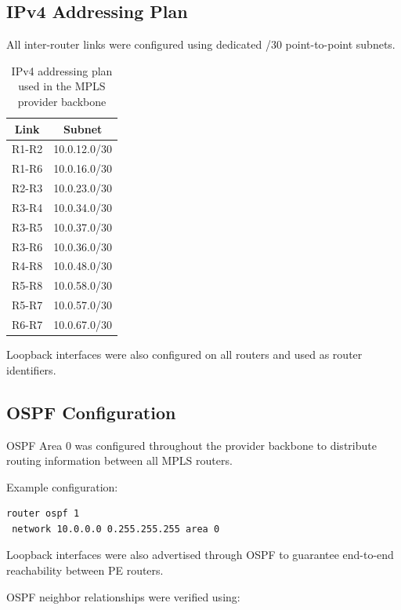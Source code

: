 \documentclass[12pt]{article}
\begin{document}
\subsection{IPv4 Addressing Plan}

All inter-router links were configured using dedicated /30 point-to-point subnets.

\begin{table}[H]
\centering
\begin{tabular}{cc}
\toprule
\textbf{Link} & \textbf{Subnet} \\
\midrule
R1-R2 & 10.0.12.0/30 \\
R1-R6 & 10.0.16.0/30 \\
R2-R3 & 10.0.23.0/30 \\
R3-R4 & 10.0.34.0/30 \\
R3-R5 & 10.0.37.0/30 \\
R3-R6 & 10.0.36.0/30 \\
R4-R8 & 10.0.48.0/30 \\
R5-R8 & 10.0.58.0/30 \\
R5-R7 & 10.0.57.0/30 \\
R6-R7 & 10.0.67.0/30 \\
\bottomrule
\end{tabular}
\caption{IPv4 addressing plan used in the MPLS provider backbone}
\end{table}

Loopback interfaces were also configured on all routers and used as router identifiers.

\subsection{OSPF Configuration}

OSPF Area 0 was configured throughout the provider backbone to distribute routing information between all MPLS routers.

Example configuration:

\begin{lstlisting}
router ospf 1
 network 10.0.0.0 0.255.255.255 area 0
\end{lstlisting}

Loopback interfaces were also advertised through OSPF to guarantee end-to-end reachability between PE routers.

OSPF neighbor relationships were verified using:
\end{document}

